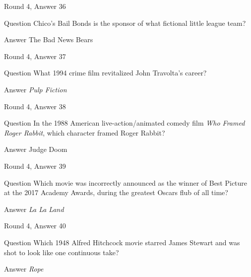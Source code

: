 \documentclass[11pt]{beamer}
\begin{document}
\begin{frame}[t]{Round 4, Answer 36}
\vspace{2em}
\begin{block}{Question}
Chico's Bail Bonds is the sponsor of what fictional little league team?
\end{block}
\pause{}
\begin{block}{Answer}
The Bad News Bears
\end{block}
\end{frame}
    

\begin{frame}[t]{Round 4, Answer 37}
\vspace{2em}
\begin{block}{Question}
What 1994 crime film revitalized John Travolta's career?
\end{block}
\pause{}
\begin{block}{Answer}
\emph{Pulp Fiction}
\end{block}
\end{frame}
    

\begin{frame}[t]{Round 4, Answer 38}
\vspace{2em}
\begin{block}{Question}
In the 1988 American live-action/animated comedy film \emph{Who Framed Roger Rabbit}, which character framed Roger Rabbit?
\end{block}
\pause{}
\begin{block}{Answer}
Judge Doom
\end{block}
\end{frame}
    

\begin{frame}[t]{Round 4, Answer 39}
\vspace{2em}
\begin{block}{Question}
Which movie was incorrectly announced as the winner of Best Picture at the 2017 Academy Awards, during the greatest Oscars flub of all time?
\end{block}
\pause{}
\begin{block}{Answer}
\emph{La La Land}
\end{block}
\end{frame}
    

\begin{frame}[t]{Round 4, Answer 40}
\vspace{2em}
\begin{block}{Question}
Which 1948 Alfred Hitchcock movie starred James Stewart and was shot to look like one continuous take?
\end{block}
\pause{}
\begin{block}{Answer}
\emph{Rope}
\end{block}
\end{frame}
    
\end{document}
